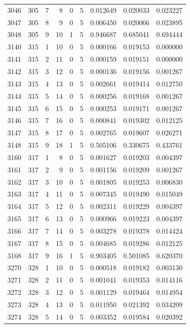\begin{longtable}{rrrrrrrrr}
3046 & 305 & 7 & 8 & 0 & 5 & 0.012649 & 0.020033 & 0.023227 \\
3047 & 305 & 8 & 9 & 0 & 5 & 0.006450 & 0.020066 & 0.023895 \\
3048 & 305 & 9 & 10 & 1 & 5 & 0.946687 & 0.685041 & 0.694444 \\
3140 & 315 & 1 & 10 & 0 & 5 & 0.000166 & 0.019153 & 0.000000 \\
3141 & 315 & 2 & 11 & 0 & 5 & 0.000159 & 0.019151 & 0.000000 \\
3142 & 315 & 3 & 12 & 0 & 5 & 0.000136 & 0.019156 & 0.001267 \\
3143 & 315 & 4 & 13 & 0 & 5 & 0.002661 & 0.019414 & 0.012750 \\
3144 & 315 & 5 & 14 & 0 & 5 & 0.000256 & 0.019168 & 0.001267 \\
3145 & 315 & 6 & 15 & 0 & 5 & 0.000253 & 0.019171 & 0.001267 \\
3146 & 315 & 7 & 16 & 0 & 5 & 0.000841 & 0.019302 & 0.012125 \\
3147 & 315 & 8 & 17 & 0 & 5 & 0.002765 & 0.019607 & 0.026271 \\
3148 & 315 & 9 & 18 & 1 & 5 & 0.505106 & 0.330675 & 0.433761 \\
3160 & 317 & 1 & 8 & 0 & 5 & 0.001627 & 0.019203 & 0.004397 \\
3161 & 317 & 2 & 9 & 0 & 5 & 0.001156 & 0.019209 & 0.001267 \\
3162 & 317 & 3 & 10 & 0 & 5 & 0.001805 & 0.019253 & 0.006830 \\
3163 & 317 & 4 & 11 & 0 & 5 & 0.007345 & 0.019490 & 0.015049 \\
3164 & 317 & 5 & 12 & 0 & 5 & 0.002311 & 0.019229 & 0.004397 \\
3165 & 317 & 6 & 13 & 0 & 5 & 0.000966 & 0.019223 & 0.004397 \\
3166 & 317 & 7 & 14 & 0 & 5 & 0.003278 & 0.019378 & 0.014424 \\
3167 & 317 & 8 & 15 & 0 & 5 & 0.004685 & 0.019286 & 0.012125 \\
3168 & 317 & 9 & 16 & 1 & 5 & 0.903405 & 0.501085 & 0.620370 \\
3270 & 328 & 1 & 10 & 0 & 5 & 0.000518 & 0.019182 & 0.003130 \\
3271 & 328 & 2 & 11 & 0 & 5 & 0.001041 & 0.019353 & 0.014116 \\
3272 & 328 & 3 & 12 & 0 & 5 & 0.001129 & 0.019464 & 0.014954 \\
3273 & 328 & 4 & 13 & 0 & 5 & 0.011950 & 0.021392 & 0.034209 \\
3274 & 328 & 5 & 14 & 0 & 5 & 0.003352 & 0.019584 & 0.020392 \\

\end{longtable}
